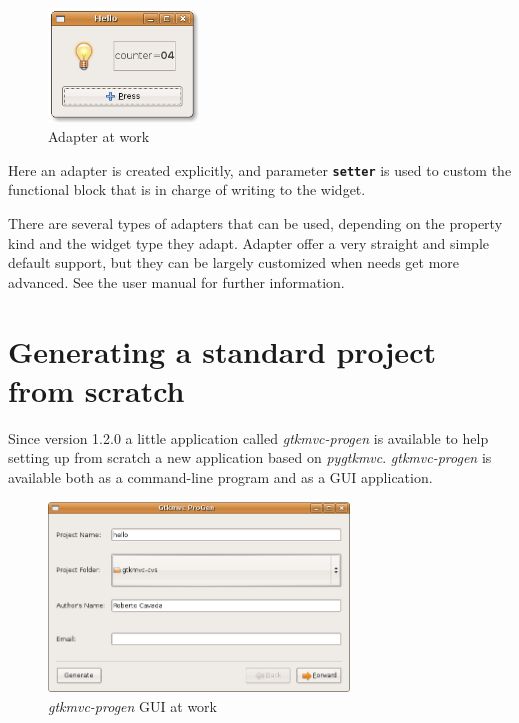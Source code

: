 \documentclass{article}
\newcommand{\kw}[1]{\emph{#1}\xspace}
\newcommand{\pygtkmvc}{\kw{pygtkmvc}}
\newcommand{\codename}[1]{\texttt{\bfseries \textcolor {codecolor}{#1}}\xspace}
\begin{document}
\begin{figure}[htbp]
\begin{center}
\includegraphics[width=4cm]{eps/adap}
\caption{\label{fig:adap}Adapter at work}
\end{center}
\end{figure}

Here an adapter is created explicitly, and parameter
\codename{setter} is used to custom the functional block that is in
charge of writing to the widget.

There are several types of adapters that can be used, depending on
the property kind and the widget type they adapt. Adapter offer a
very straight and simple default support, but they can be largely
customized when needs get more advanced. See the user manual for
further information.


\section{Generating a standard project from scratch}

Since version 1.2.0 a little application called \kw{gtkmvc-progen}
is available to help setting up from scratch a new application based
on \pygtkmvc. \kw{gtkmvc-progen} is available both as a command-line
program and as a GUI application. 

\begin{figure}[htbp]
\begin{center}
\includegraphics[width=8cm]{eps/progen}
\caption{\label{fig:progen}\kw{gtkmvc-progen} GUI at work}
\end{center}
\end{figure}
\end{document}
